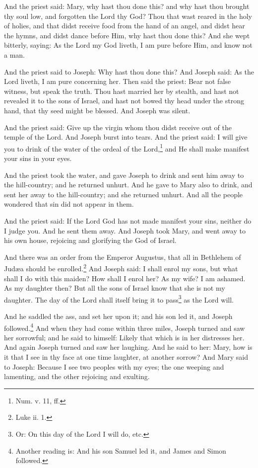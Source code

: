 \pend\pstart
And the priest said: Mary, why hast thou done this? and why hast thou brought thy soul low, and forgotten the Lord thy God? Thou that wast reared in the holy of holies, and that didst receive food from the hand of an angel, and didst hear the hymns, and didst dance before Him, why hast thou done this? And she wept bitterly, saying: As the Lord my God liveth, I am pure before Him, and know not a man.

\pend\pstart
And the priest said to Joseph: Why hast thou done this? And Joseph said: As the Lord liveth, I am pure concerning her. Then said the priest: Bear not false witness, but speak the truth. Thou hast married her by stealth, and hast not revealed it to the sons of Israel, and hast not bowed thy head under the strong hand, that thy seed might be blessed. And Joseph was silent.

\pend\pstart
{}

\pend\setcounter{pstartR}{1}\pstart
And the priest said: Give up the virgin whom thou didst receive out of the temple of the Lord. And Joseph burst into tears. And the priest said: I will give you to drink of the water of the ordeal of the Lord,\footnote{Num. v. 11, ff.} and He shall make manifest your sins in your eyes.

\pend\pstart
And the priest took the water, and gave Joseph to drink and sent him away to the hill-country; and he returned unhurt. And he gave to Mary also to drink, and sent her away to the hill-country; and she returned unhurt. And all the people wondered that sin did not appear in them.

\pend\pstart
And the priest said: If the Lord God has not made manifest your sins, neither do I judge you. And he sent them away. And Joseph took Mary, and went away to his own house, rejoicing and glorifying the God of Israel.

\pend\pstart
{}

\pend\setcounter{pstartR}{1}\pstart
And there was an order from the Emperor Augustus, that all in Bethlehem of Judæa should be enrolled.\footnote{Luke ii. 1.} And Joseph said: I shall enrol my sons, but what shall I do with this maiden? How shall I enrol her? As my wife? I am ashamed. As my daughter then? But all the sons of Israel know that she is not my daughter. The day of the Lord shall itself bring it to pass\footnote{Or: On this day of the Lord I will do, etc.} as the Lord will.

\pend\pstart
And he saddled the ass, and set her upon it; and his son led it, and Joseph followed.\footnote{Another reading is: And his son Samuel led it, and James and Simon followed.} And when they had come within three miles, Joseph turned and saw her sorrowful; and he said to himself: Likely that which is in her distresses her. And again Joseph turned and saw her laughing. And he said to her: Mary, how is it that I see in thy face at one time laughter, at another sorrow? And Mary said to Joseph: Because I see two peoples with my eyes; the one weeping and lamenting, and the other rejoicing and exulting.

